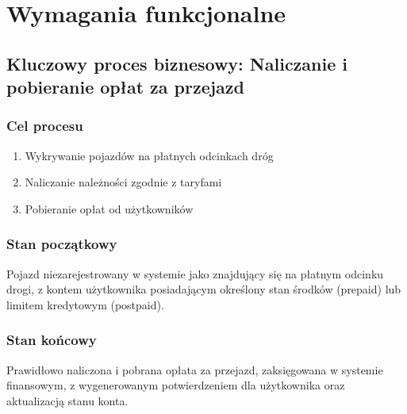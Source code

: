 \documentclass[12pt]{article}
\begin{document}
\section{Wymagania funkcjonalne}

\subsection{Kluczowy proces biznesowy: Naliczanie i pobieranie opłat za przejazd}

\subsubsection{Cel procesu}
\begin{enumerate}
    \item Wykrywanie pojazdów na płatnych odcinkach dróg
    \item Naliczanie należności zgodnie z taryfami
    \item Pobieranie opłat od użytkowników
\end{enumerate}

\subsubsection{Stan początkowy}
Pojazd niezarejestrowany w systemie jako znajdujący się na płatnym odcinku drogi, z kontem użytkownika posiadającym określony stan środków (prepaid) lub limitem kredytowym (postpaid).

\subsubsection{Stan końcowy}
Prawidłowo naliczona i pobrana opłata za przejazd, zaksięgowana w systemie finansowym, z wygenerowanym potwierdzeniem dla użytkownika oraz aktualizacją stanu konta.
\end{document}
